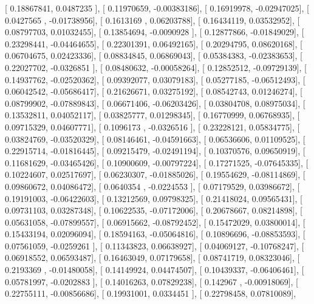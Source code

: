 \documentclass{article}
\begin{document}
       [ 0.18867841,  0.0487235 ],
       [ 0.11970659, -0.00383186],
       [ 0.16919978, -0.02947025],
       [ 0.0427565 , -0.01738956],
       [ 0.1613169 ,  0.06203788],
       [ 0.16434119,  0.03532952],
       [ 0.08797703,  0.01032455],
       [ 0.13854694, -0.0090928 ],
       [ 0.12877866, -0.01849029],
       [ 0.23298441, -0.04464655],
       [ 0.22301391,  0.06492165],
       [ 0.20294795,  0.08620168],
       [ 0.06704675,  0.02423336],
       [ 0.08834845,  0.06869043],
       [ 0.05384383, -0.02383653],
       [ 0.22027702, -0.0326851 ],
       [ 0.08480632, -0.00058264],
       [ 0.12852512, -0.09729139],
       [ 0.14937762, -0.02520362],
       [ 0.09392077,  0.03079183],
       [ 0.05277185, -0.06512493],
       [ 0.06042542, -0.05686417],
       [ 0.21626671,  0.03275192],
       [ 0.08542743,  0.01246274],
       [ 0.08799902, -0.07889843],
       [ 0.06671406, -0.06203426],
       [ 0.03804708,  0.08975034],
       [ 0.13532811,  0.04052117],
       [ 0.03825777,  0.01298345],
       [ 0.16770999,  0.06768935],
       [ 0.09715329,  0.04607771],
       [ 0.1096173 , -0.0326516 ],
       [ 0.23228121,  0.05834775],
       [ 0.03824769, -0.03520329],
       [ 0.08146461, -0.04591663],
       [ 0.06536606,  0.01109525],
       [ 0.22915714, -0.01816445],
       [ 0.09215479, -0.02491194],
       [ 0.10370576,  0.09650919],
       [ 0.11681629, -0.03465426],
       [ 0.10900609, -0.00797224],
       [ 0.17271525, -0.07645335],
       [ 0.10224607,  0.02517697],
       [ 0.06230307, -0.01885026],
       [ 0.19554629, -0.08114869],
       [ 0.09860672,  0.04086472],
       [ 0.0640354 , -0.0224553 ],
       [ 0.07179529,  0.03986672],
       [ 0.19191003, -0.06422603],
       [ 0.13212569,  0.09798325],
       [ 0.21418024,  0.09565431],
       [ 0.09731103,  0.03287348],
       [ 0.10622535, -0.07172006],
       [ 0.20678667,  0.08214898],
       [ 0.05631058, -0.07899557],
       [ 0.06915662, -0.08792452],
       [ 0.15472029,  0.03800014],
       [ 0.15433194,  0.02096094],
       [ 0.18594163, -0.05064816],
       [ 0.10896696, -0.08853593],
       [ 0.07561059, -0.0259261 ],
       [ 0.11343823,  0.06638927],
       [ 0.04069127, -0.10768247],
       [ 0.06918552,  0.06593487],
       [ 0.16463049,  0.07179658],
       [ 0.08741719,  0.08323046],
       [ 0.2193369 , -0.01480058],
       [ 0.14149924,  0.04474507],
       [ 0.10439337, -0.06406461],
       [ 0.05781997, -0.0202883 ],
       [ 0.14016263,  0.07829238],
       [ 0.142967  , -0.00918069],
       [ 0.22755111, -0.00856686],
       [ 0.19931001,  0.0334451 ],
       [ 0.22798458,  0.07810089],
\end{document}
